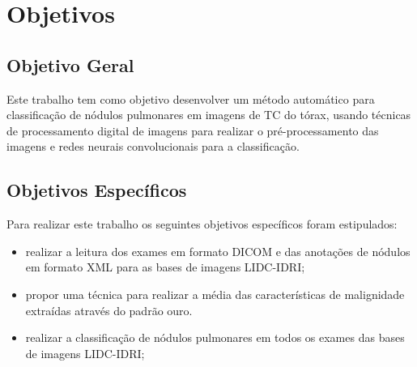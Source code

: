 

\section{Objetivos}

\subsection{Objetivo Geral}

Este trabalho tem como objetivo desenvolver um método automático para classificação de nódulos pulmonares em imagens de TC do tórax, usando técnicas de processamento digital de imagens para realizar o pré-processamento das imagens e redes neurais convolucionais para a classificação. 

\subsection{Objetivos Específicos}

Para realizar este trabalho os seguintes objetivos específicos foram estipulados:

\begin{itemize}
	\item realizar a leitura dos exames em formato DICOM e das anotações de nódulos em formato XML para as bases de imagens LIDC-IDRI;
	\item propor uma técnica para realizar a média das características de malignidade extraídas através do padrão ouro. 
	\item realizar a classificação de nódulos pulmonares em todos os exames das bases de imagens LIDC-IDRI;
\end{itemize}




